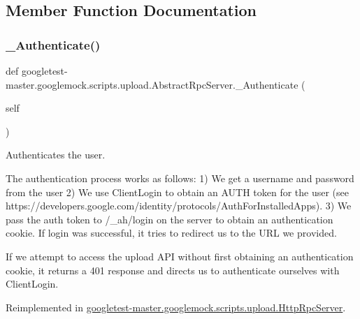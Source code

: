 \subsection{Member Function Documentation}
\mbox{\label{classgoogletest-master_1_1googlemock_1_1scripts_1_1upload_1_1_abstract_rpc_server_a5a5c3f303618a625650491e76181ca10}} 
\subsubsection{\texorpdfstring{\_Authenticate()}{\_Authenticate()}}
{\footnotesize\ttfamily def googletest-\/master.\+googlemock.\+scripts.\+upload.\+Abstract\+Rpc\+Server.\+\_\+\+Authenticate (\begin{DoxyParamCaption}\item[{}]{self }\end{DoxyParamCaption})\hspace{0.3cm}{\ttfamily [private]}}

\begin{DoxyVerb}Authenticates the user.

The authentication process works as follows:
 1) We get a username and password from the user
 2) We use ClientLogin to obtain an AUTH token for the user
(see https://developers.google.com/identity/protocols/AuthForInstalledApps).
 3) We pass the auth token to /_ah/login on the server to obtain an
authentication cookie. If login was successful, it tries to redirect
us to the URL we provided.

If we attempt to access the upload API without first obtaining an
authentication cookie, it returns a 401 response and directs us to
authenticate ourselves with ClientLogin.
\end{DoxyVerb}
 

Reimplemented in \mbox{\hyperlink{classgoogletest-master_1_1googlemock_1_1scripts_1_1upload_1_1_http_rpc_server_a1d68326ecc376f22a5509fd753498558}{googletest-\/master.\+googlemock.\+scripts.\+upload.\+Http\+Rpc\+Server}}.

\mbox{\label{classgoogletest-master_1_1googlemock_1_1scripts_1_1upload_1_1_abstract_rpc_server_ac0e2f4595bad289b6ff312b7583d6e48}} 
